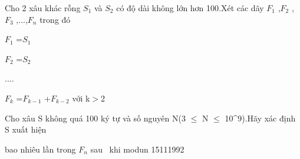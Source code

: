 Cho 2 xâu khác rỗng $S_{1}$   và $S_{2}$   có độ dài không lớn hơn 100.Xét các dãy $F_{1}$   ,$F_{2}$   ,$F_{3}$   ,...,$F_{n}$   trong đó   


   $F_{1}$   =$S_{1}$


   $F_{2}$   =$S_{2}$


   ....   


   $F_{k}$   =$F_{k-1}$   +$F_{k-2}$   với k$>$2   


   Cho xâu S không quá 100 ký tự và số nguyên N(3 $\le$ N $\le$ 10^9).Hãy xác định S xuất hiện   


   bao nhiêu lần trong $F_{n}$   sau  khi modun 15111992